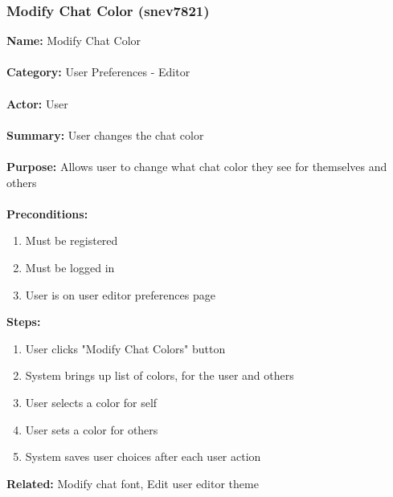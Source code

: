 \documentclass[11pt]{report}
\begin{document}
\subsubsection{Modify Chat Color (snev7821)}
\begin{framed}
	\noindent\textbf{Name:} Modify Chat Color \\ \\
	\textbf{Category:} User Preferences - Editor  \\ \\
	\textbf{Actor:} User \\ \\
	\textbf{Summary:} User changes the chat color \\ \\
	\textbf{Purpose:} Allows user to change what chat color they see for themselves and others \\ \\
	\textbf{Preconditions:} 
	\begin{enumerate}
		\item Must be registered
		\item Must be logged in
		\item User is on user editor preferences page
	\end{enumerate}
	\textbf{Steps:}
	\begin{enumerate}
		\item User clicks "Modify Chat Colors" button
		\item System brings up list of colors, for the user and others
		\item User selects a color for self
		\item User sets a color for others
		\item System saves user choices after each user action
	\end{enumerate}
	\textbf{Related:} Modify chat font, Edit user editor theme
\end{framed}

\newpage
\end{document}
